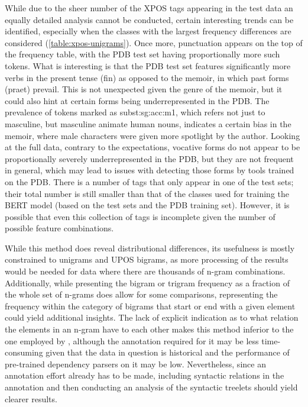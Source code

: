 While due to the sheer number of the XPOS tags appearing in the test data an equally detailed analysis cannot be conducted, certain interesting trends can be identified, especially when the classes with the largest frequency differences are considered (\autoref{table:xpos-unigrams}). Once more, punctuation appears on the top of the frequency table, with the PDB test set having proportionally more such tokens. What is interesting is that the PDB test set features significantly more verbs in the present tense (fin) as opposed to the memoir, in which past forms (praet) prevail. This is not unexpected given the genre of the memoir, but it could also hint at certain forms being underrepresented in the PDB. The prevalence of tokens marked as subst:sg:acc:m1, which refers not just to masculine, but masculine animate human nouns, indicates a certain bias in the memoir, where male characters were given more spotlight by the author. Looking at the full data, contrary to the expectations, vocative forms do not appear to be proportionally severely underrepresented in the PDB, but they are not frequent in general, which may lead to issues with detecting those forms by tools trained on the PDB. There is a number of tags that only appear in one of the test sets; their total number is still smaller than that of the classes used for training the BERT model (based on the test sets and the PDB training set). However, it is possible that even this collection of tags is incomplete given the number of possible feature combinations.

While this method does reveal distributional differences, its usefulness is mostly constrained to unigrams and UPOS bigrams, as more processing of the results would be needed for data where there are thousands of n-gram combinations. Additionally, while presenting the bigram or trigram frequency as a fraction of the whole set of n-grams does allow for some comparisons, representing the frequency within the category of bigrams that start or end with a given element could yield additional insights. The lack of explicit indication as to what relation the elements in an n-gram have to each other makes this method inferior to the one employed by \citet{johannsen-etal-2015-cross}, although the annotation required for it may be less time-consuming given that the data in question is historical and the performance of pre-trained dependency parsers on it may be low. Nevertheless, since an annotation effort already has to be made, including syntactic relations in the annotation and then conducting an analysis of the syntactic treelets should yield clearer results.  

